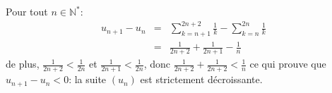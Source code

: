 Pour tout $n\in \mathbb{N}^*$:
\begin{eqnarray}
  u_{n+1}-u_n &=& \sum_{k=n+1}^{2n+2}{\frac{1}{k}} - \sum_{k=n}^{2n}{\frac{1}{k}} \nonumber \\
       &=& \frac{1}{2n+2} + \frac{1}{2n+1} - \frac{1}{n} \nonumber 
\end{eqnarray}
de plus, $ \frac{1}{2n+2} < \frac{1}{2n}$ et $ \frac{1}{2n+1} < \frac{1}{2n}$, donc $\frac{1}{2n+2} + \frac{1}{2n+2} < \frac{1}{n}$ ce qui prouve que $u_{n+1}-u_n<0$: la suite $(u_n)$ est strictement décroissante.
